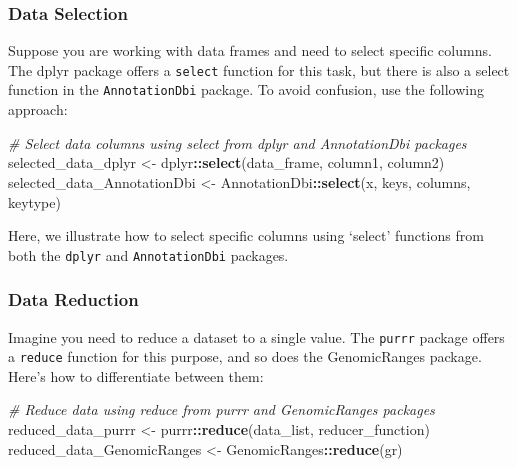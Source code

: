 \documentclass[
]{book}
\newenvironment{Shaded}{\begin{snugshade}}{\end{snugshade}}
\newcommand{\CommentTok}[1]{\textcolor[rgb]{0.56,0.35,0.01}{\textit{#1}}}
\newcommand{\FunctionTok}[1]{\textcolor[rgb]{0.13,0.29,0.53}{\textbf{#1}}}
\newcommand{\NormalTok}[1]{#1}
\newcommand{\OtherTok}[1]{\textcolor[rgb]{0.56,0.35,0.01}{#1}}
\newcommand{\SpecialCharTok}[1]{\textcolor[rgb]{0.81,0.36,0.00}{\textbf{#1}}}
\begin{document}
\hypertarget{data-selection}{%
\subsubsection{Data Selection}\label{data-selection}}

Suppose you are working with data frames and need to select specific columns. The dplyr package offers a \texttt{select} function for this task, but there is also a select function in the \texttt{AnnotationDbi} package. To avoid confusion, use the following approach:

\begin{Shaded}
\begin{Highlighting}[]
\CommentTok{\# Select data columns using \textquotesingle{}select\textquotesingle{} from \textquotesingle{}dplyr\textquotesingle{} and \textquotesingle{}AnnotationDbi\textquotesingle{} packages}
\NormalTok{selected\_data\_dplyr }\OtherTok{\textless{}{-}}\NormalTok{ dplyr}\SpecialCharTok{::}\FunctionTok{select}\NormalTok{(data\_frame, column1, column2)}
\NormalTok{selected\_data\_AnnotationDbi }\OtherTok{\textless{}{-}}\NormalTok{ AnnotationDbi}\SpecialCharTok{::}\FunctionTok{select}\NormalTok{(x, keys, columns, keytype)}
\end{Highlighting}
\end{Shaded}

Here, we illustrate how to select specific columns using `select' functions from both the \texttt{dplyr} and \texttt{AnnotationDbi} packages.

\hypertarget{data-reduction}{%
\subsubsection{Data Reduction}\label{data-reduction}}

Imagine you need to reduce a dataset to a single value. The \texttt{purrr} package offers a \texttt{reduce} function for this purpose, and so does the GenomicRanges package. Here's how to differentiate between them:

\begin{Shaded}
\begin{Highlighting}[]
\CommentTok{\# Reduce data using \textquotesingle{}reduce\textquotesingle{} from \textquotesingle{}purrr\textquotesingle{} and \textquotesingle{}GenomicRanges\textquotesingle{} packages}
\NormalTok{reduced\_data\_purrr }\OtherTok{\textless{}{-}}\NormalTok{ purrr}\SpecialCharTok{::}\FunctionTok{reduce}\NormalTok{(data\_list, reducer\_function)}
\NormalTok{reduced\_data\_GenomicRanges }\OtherTok{\textless{}{-}}\NormalTok{ GenomicRanges}\SpecialCharTok{::}\FunctionTok{reduce}\NormalTok{(gr)}
\end{Highlighting}
\end{Shaded}
\end{document}
